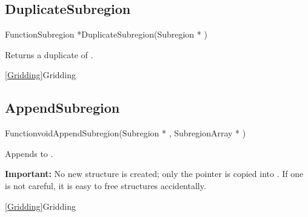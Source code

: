 
\newpage
\subsection{DuplicateSubregion}
\label{DuplicateSubregion}


\begin{deftypefn}{Function}{Subregion *}{DuplicateSubregion}({Subregion *} )

\DESCRIPTION
Returns a duplicate of .

\SEEALSO
\vref{Gridding}{Gridding}

\end{deftypefn}


\newpage
\subsection{AppendSubregion}
\label{AppendSubregion}


\begin{deftypefn}{Function}{void}{AppendSubregion}({Subregion *} , {SubregionArray *} )

\DESCRIPTION
Appends  to .

\NOTES
{\bf Important:}
No new  structure is created; only the pointer
is copied into .
If one is not careful, it is easy to free  structures
accidentally.

\SEEALSO
\vref{Gridding}{Gridding}

\end{deftypefn}


